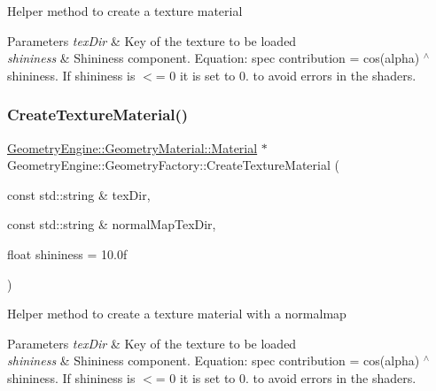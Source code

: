 Helper method to create a texture material 
\begin{DoxyParams}{Parameters}
{\em tex\+Dir} & Key of the texture to be loaded \\
\hline
{\em shininess} & Shininess component. Equation\+: spec contribution = cos(alpha) $^\wedge$ shininess. If shininess is $<$= 0 it is set to 0. to avoid errors in the shaders. \\
\hline
\end{DoxyParams}
\mbox{\label{class_geometry_engine_1_1_geometry_factory_a5f40952552368c0c0db6d07d42ef17c5}} 
\subsubsection{\texorpdfstring{CreateTextureMaterial()}{CreateTextureMaterial()}\hspace{0.1cm}{\footnotesize\ttfamily [2/4]}}
{\footnotesize\ttfamily \mbox{\hyperlink{class_geometry_engine_1_1_geometry_material_1_1_material}{Geometry\+Engine\+::\+Geometry\+Material\+::\+Material}} $\ast$ Geometry\+Engine\+::\+Geometry\+Factory\+::\+Create\+Texture\+Material (\begin{DoxyParamCaption}\item[{const std\+::string \&}]{tex\+Dir,  }\item[{const std\+::string \&}]{normal\+Map\+Tex\+Dir,  }\item[{float}]{shininess = {\ttfamily 10.0f} }\end{DoxyParamCaption})\hspace{0.3cm}{\ttfamily [static]}}

Helper method to create a texture material with a normalmap 
\begin{DoxyParams}{Parameters}
{\em tex\+Dir} & Key of the texture to be loaded \\
\hline
{\em shininess} & Shininess component. Equation\+: spec contribution = cos(alpha) $^\wedge$ shininess. If shininess is $<$= 0 it is set to 0. to avoid errors in the shaders. \\
\hline
\end{DoxyParams}
\mbox{\label{class_geometry_engine_1_1_geometry_factory_adcb6d5a41689e574ef468a21ae4c7516}} 
